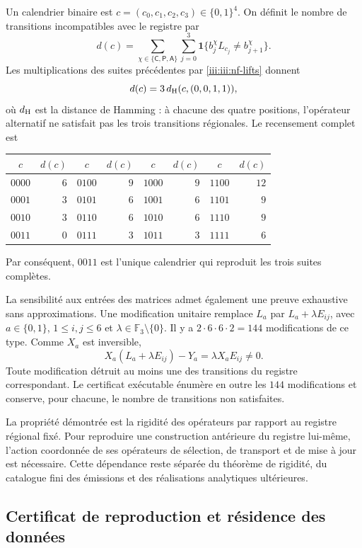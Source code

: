 Un calendrier binaire est $c=(c_0,c_1,c_2,c_3)\in\{0,1\}^4$.
On définit le nombre de transitions incompatibles avec le registre par
\begin{equation}
 d(c)=\sum_{\chi\in\{\mathsf C,\mathsf P,\mathsf A\}}
       \sum_{j=0}^{3}
       \mathbf1\{b_j^\chi L_{c_j}\ne b_{j+1}^\chi\}.
 \label{iii:iii:nf-calendario}
\end{equation}
Les multiplications des suites précédentes par
\eqref{iii:iii:nf-lifts} donnent
\[
 d(c)=3\,d_{\rm H}(c,(0,0,1,1)),
\]
où $d_{\rm H}$ est la distance de Hamming : à chacune des
quatre positions, l’opérateur alternatif ne satisfait pas les trois
transitions régionales. Le recensement complet est
\begin{center}
\begin{tabular}{cr@{\qquad}cr@{\qquad}cr@{\qquad}cr}
$c$&$d(c)$&$c$&$d(c)$&$c$&$d(c)$&$c$&$d(c)$\\ \hline
$0000$&$6$&$0100$&$9$&$1000$&$9$&$1100$&$12$\\
$0001$&$3$&$0101$&$6$&$1001$&$6$&$1101$&$9$\\
$0010$&$3$&$0110$&$6$&$1010$&$6$&$1110$&$9$\\
$0011$&$0$&$0111$&$3$&$1011$&$3$&$1111$&$6$
\end{tabular}
\end{center}
Par conséquent, $0011$ est l’unique calendrier qui reproduit les
trois suites complètes.

La sensibilité aux entrées des matrices admet également une
preuve exhaustive sans approximations. Une modification unitaire
remplace $L_a$ par $L_a+\lambda E_{ij}$, avec
$a\in\{0,1\}$, $1\le i,j\le6$ et
$\lambda\in\mathbb F_3\setminus\{0\}$. Il y a
$2\cdot6\cdot6\cdot2=144$ modifications de ce type. Comme
$X_a$ est inversible,
\[
 X_a(L_a+\lambda E_{ij})-Y_a
 =\lambda X_aE_{ij}\ne0.
\]
Toute modification détruit au moins une des transitions du
registre correspondant. Le certificat exécutable énumère en outre
les $144$ modifications et conserve, pour chacune, le nombre de
transitions non satisfaites.

La propriété démontrée est la rigidité des opérateurs par rapport au
registre régional fixé. Pour reproduire une construction antérieure
du registre lui-même, l’action coordonnée de ses opérateurs
de sélection, de transport et de mise à jour est nécessaire. Cette dépendance reste
séparée du théorème de rigidité, du catalogue fini des émissions et
des réalisations analytiques ultérieures.

\subsection{Certificat de reproduction et résidence des données}

